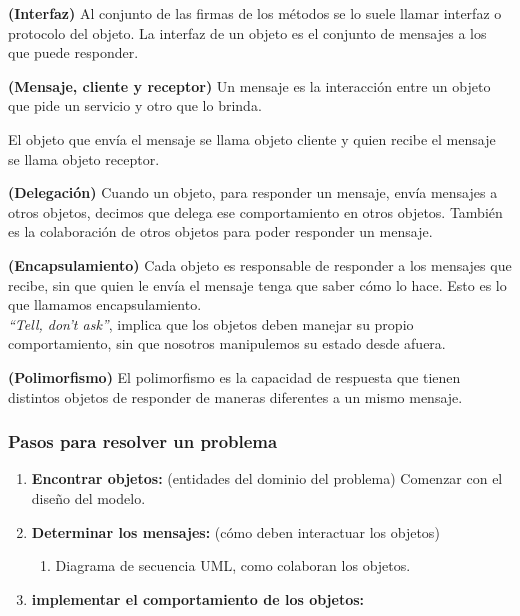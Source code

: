 \documentclass[../main.tex]{subfiles}
\begin{document}
        \begin{definition} \textbf{(Interfaz)}
            Al conjunto de las firmas de los métodos se lo suele llamar interfaz o protocolo del objeto. La interfaz de un objeto es el conjunto de mensajes a los que puede responder.
        \end{definition}

        \begin{definition} \textbf{(Mensaje, cliente y receptor)}
            Un mensaje es la interacción entre un objeto que pide un servicio y otro que lo brinda.

            El objeto que envía el mensaje se llama objeto cliente y quien recibe el mensaje se llama objeto receptor.
            
        \end{definition}

        \begin{definition} \textbf{(Delegación)}
            Cuando un objeto, para responder un mensaje, envía mensajes a otros objetos, decimos que delega ese comportamiento en otros objetos. También es la colaboración de otros objetos para poder responder un mensaje.
        \end{definition}

        \begin{definition} \textbf{(Encapsulamiento)}
            Cada objeto es responsable de responder a los mensajes que recibe, sin que quien le envía el mensaje tenga que saber cómo lo hace. Esto es lo que llamamos encapsulamiento.\\

            \textit{“Tell, don’t ask”}, implica que los objetos deben manejar su propio comportamiento, sin que nosotros manipulemos su estado desde afuera.
        \end{definition}

        \begin{definition} \textbf{(Polimorfismo)}
            El polimorfismo es la capacidad de respuesta que tienen distintos objetos de responder de maneras diferentes a un mismo mensaje.
        \end{definition}

        \subsubsection{Pasos para resolver un problema}
            \begin{enumerate}
                \item \textbf{Encontrar objetos:} (entidades del dominio del problema)
                    Comenzar con el diseño del modelo.
                \item \textbf{Determinar los mensajes:} (cómo deben interactuar los objetos)
                    \begin{enumerate}
                        \item Diagrama de secuencia UML, como colaboran los objetos.
                    \end{enumerate}
                \item \textbf{implementar el comportamiento de los objetos:} 
            \end{enumerate}
\end{document}
